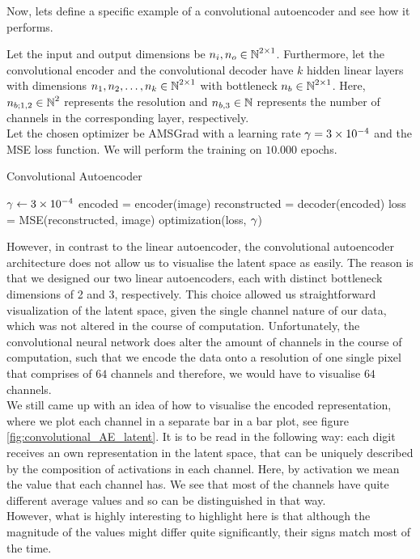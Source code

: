 Now, lets define a specific example of a convolutional autoencoder and see how it performs.

\begin{algorithm}
Let the input and output dimensions be $n_i, n_o \in \operatorname{\mathbb{N}}^{2\times 1}$. Furthermore, let the convolutional encoder and the convolutional decoder have $k$ hidden linear layers with dimensions $n_1, n_2,\ldots, n_k\in \operatorname{\mathbb{N}}^{2\times 1}$ with bottleneck $n_b\in\operatorname{\mathbb{N}}^{2\times 1}$. Here, $n_{b;1,2}\in\operatorname{\mathbb{N}}^{2}$ represents the resolution and $n_{b,3}\in\operatorname{\mathbb{N}}$ represents the number of channels in the corresponding layer, respectively.\\
Let the chosen optimizer be AMSGrad with a learning rate $\operatorname{\gamma}=\num{3e-4}$ and the MSE loss function. We will perform the training on $10.000$ epochs.
\caption{Convolutional Autoencoder}\label{alg:convolutional_AE}
\begin{algorithmic}[1]
\Require $\operatorname{\gamma} \gets \num{3e-4}$
	    \State encoded = encoder(image) 
		\State reconstructed = decoder(encoded) 
    	\State loss = MSE(reconstructed, image) 
	    \State optimization(loss, $\operatorname{\gamma}$) 
    \EndFor
\EndFor
\end{algorithmic}
\end{algorithm}

However, in contrast to the linear autoencoder, the convolutional autoencoder architecture does not allow us to visualise the latent space as easily. The reason is that we designed our two linear autoencoders, each with distinct bottleneck dimensions of 2 and 3, respectively. This choice allowed us straightforward visualization of the latent space, given the single channel nature of our data, which was not altered in the course of computation. Unfortunately, the convolutional neural network does alter the amount of channels in the course of computation, such that we encode the data onto a resolution of one single pixel that comprises of $64$ channels and therefore, we would have to visualise $64$ channels.\\
We still came up with an idea of how to visualise the encoded representation, where we plot each channel in a separate bar in a bar plot, see figure \ref{fig:convolutional_AE_latent}. It is to be read in the following way: each digit receives an own representation in the latent space, that can be uniquely described by the composition of activations in each channel. Here, by activation we mean the value that each channel has. We see that most of the channels have quite different average values and so can be distinguished in that way.\\
However, what is highly interesting to highlight here is that although the magnitude of the values might differ quite significantly, their signs match most of the time.



